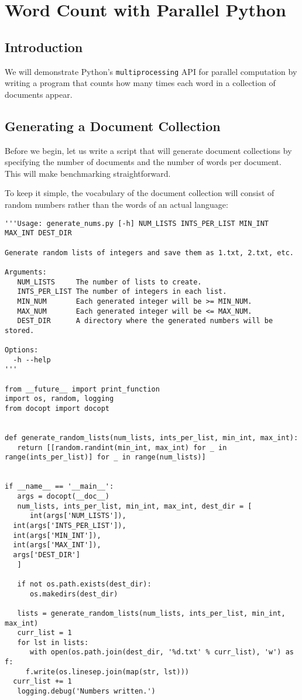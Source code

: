 \section{Word Count with Parallel Python}\label{word-count-1-parallel-python}

\subsection{Introduction}

We will demonstrate Python's \texttt{multiprocessing} API
for parallel computation by writing a program that counts how many times
each word in a collection of documents appear.

\subsection{Generating a Document Collection}

Before we begin, let us write a script that will generate document
collections by specifying the number of documents and the number of
words per document. This will make benchmarking straightforward.

To keep it simple, the vocabulary of the document collection will
consist of random numbers rather than the words of an actual language:

\begin{lstlisting}
'''Usage: generate_nums.py [-h] NUM_LISTS INTS_PER_LIST MIN_INT MAX_INT DEST_DIR

Generate random lists of integers and save them as 1.txt, 2.txt, etc.

Arguments:
   NUM_LISTS     The number of lists to create.
   INTS_PER_LIST The number of integers in each list.
   MIN_NUM       Each generated integer will be >= MIN_NUM.
   MAX_NUM       Each generated integer will be <= MAX_NUM.
   DEST_DIR      A directory where the generated numbers will be stored.

Options:
  -h --help
'''

from __future__ import print_function
import os, random, logging
from docopt import docopt


def generate_random_lists(num_lists, ints_per_list, min_int, max_int):
   return [[random.randint(min_int, max_int) for _ in range(ints_per_list)] for _ in range(num_lists)]


if __name__ == '__main__':
   args = docopt(__doc__)
   num_lists, ints_per_list, min_int, max_int, dest_dir = [
      int(args['NUM_LISTS']),
  int(args['INTS_PER_LIST']),
  int(args['MIN_INT']),
  int(args['MAX_INT']),
  args['DEST_DIR']
   ]

   if not os.path.exists(dest_dir):
      os.makedirs(dest_dir)

   lists = generate_random_lists(num_lists, ints_per_list, min_int, max_int)
   curr_list = 1
   for lst in lists:
      with open(os.path.join(dest_dir, '%d.txt' % curr_list), 'w') as f:
     f.write(os.linesep.join(map(str, lst)))
  curr_list += 1
   logging.debug('Numbers written.')
\end{lstlisting}

